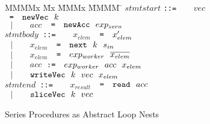 \begin{figure}
\begin{tabbing}
MMMMx            \= Mx \= MMMx \= MMMM \= \kill
$stmtstart$     
 \> \tt{::=}    \> ~~ $vec$      \> $\tt{ =}~~~ \tt{newVec}~~ k$         \\[0.5ex]
 \> $~~~|$      \> ~~ $acc$      \> $\tt{ =}~~~ \tt{newAcc}~~ exp_{zero}$
\\[1.5ex]

$stmtbody$      
 \> \tt{::=}    \> ~~ $x_{elem}$ \> $\tt{ =}~~~ x'_{elem}$               \\[0.5ex]
 \> $~~~|$      \> ~~ $x_{elem}$ \> $\tt{ =}~~~ \tt{next}~~ k~~ s_{in}$  \\[0.5ex]
 \> $~~~|$      \> ~~ $x_{elem}$ \> $\tt{ =}~~~ exp_{worker}~~ \ov{x_{elem}} $  \\[0.5ex]
 \> $~~~|$      \> ~~ $acc$      \> $\tt{:=}~~~ exp_{worker}~~ acc~~ x_{elem}$  \\[0.5ex]
 \> $~~~|$      \> ~~ $\tt{writeVec}~~ k~~ vec~~ x_{elem}$
\\[1.5ex]

$stmtend$
 \> \tt{::=}    \> ~~ $x_{result}$ \> $\tt{ =}~~~ \tt{read}~~ acc$      \\[0.5ex]
 \> $~~~|$      \> ~~ $\tt{sliceVec}~~ k~~ vec$
\end{tabbing}

\caption{Series Procedures as Abstract Loop Nests}
\label{f:Procedure}
\end{figure}

